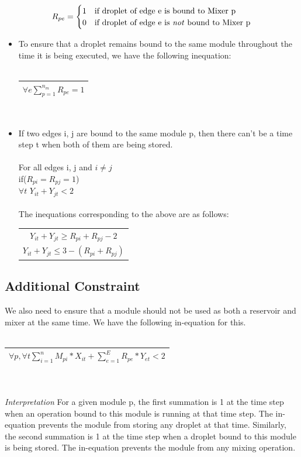 \documentclass{article}
\newcommand{\eqn}[1]{
  \begin{tabular}{|c|}
  \hline
  $#1$\\
  \hline
  \end{tabular}
}
\begin{document}
\begin{equation*}
  R_{pe} = \begin{cases}
  1  &  \text{if droplet of edge e is bound to Mixer p} \\
  0  &  \text{if droplet of edge e is \emph{not} bound to Mixer p}
  \end{cases}
\end{equation*}

\begin{itemize}

\item To ensure that a droplet remains bound to the
same module throughout the time it is being executed, we have 
the following inequation:\\\\
\eqn{\forall e \sum\limits_{p=1}^{n_m}R_{pe}=1}\\

\item If two edges i, j are bound to the same module p, then 
there can't be a time step t when both of them are being stored.\\
\\
For all edges i, j and $i\neq j$ \\if($R_{pi}=R_{pj}=1$)\\
\indent $\forall t$ $Y_{it}+ Y_{jt} < 2$\\
\\
The inequations corresponding to the above are as follows:\\ 
\begin{tabular}{|c|}
\hline
$Y_{it}+Y_{jt}\geq R_{pi}+R_{pj}-2$\\
$Y_{it}+Y_{jt}\leq 3-(R_{pi}+R_{pj})$\\
\hline
\end{tabular}
\end{itemize}
\subsection{Additional Constraint}
We also need to ensure that a module should not be used as both a reservoir and mixer at the same time. We have the following in-equation for this.\\
\\
\eqn{\forall p, \forall t \sum\limits_{i=1}^n M_{pi}*X_{it} + \sum\limits_{e=1}^E R_{pe}*Y_{et} < 2}\\\\

\emph{Interpretation} For a given module p, the first summation is 1 at the time step when an operation bound to this module is running at that time step. The in-equation prevents the module from storing any droplet at that time. Similarly, the second summation is 1 at the time step when a droplet bound to this module is being stored. The in-equation prevents the module from any mixing operation.
\end{document}
